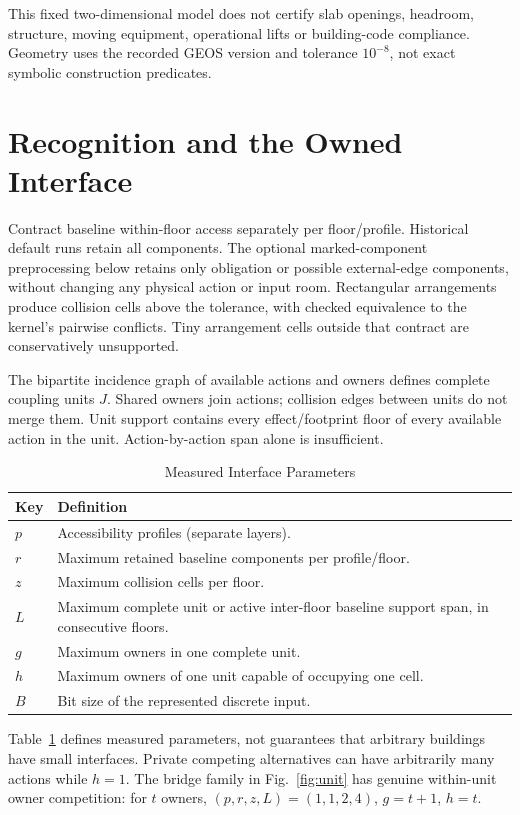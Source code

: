 \documentclass[conference]{IEEEtran}
\begin{document}
This fixed two-dimensional model does not certify slab openings, headroom, structure, moving equipment, operational lifts or building-code compliance. Geometry uses the recorded GEOS version and tolerance $10^{-8}$, not exact symbolic construction predicates.

\section{Recognition and the Owned Interface}
Contract baseline within-floor access separately per floor/profile. Historical default runs retain all components. The optional marked-component preprocessing below retains only obligation or possible external-edge components, without changing any physical action or input room. Rectangular arrangements produce collision cells above the tolerance, with checked equivalence to the kernel's pairwise conflicts. Tiny arrangement cells outside that contract are conservatively unsupported.

The bipartite incidence graph of available actions and owners defines complete coupling units $J$. Shared owners join actions; collision edges between units do not merge them. Unit support contains every effect/footprint floor of every available action in the unit. Action-by-action span alone is insufficient.

\begin{table}[t]
\caption{Measured Interface Parameters}\label{tab:parameters}
\centering\begin{tabular}{p{}p{}}
\toprule Key & Definition \\\midrule
$p$ & Accessibility profiles (separate layers).\\
$r$ & Maximum retained baseline components per profile/floor.\\
$z$ & Maximum collision cells per floor.\\
$L$ & Maximum complete unit or active inter-floor baseline support span, in consecutive floors.\\
$g$ & Maximum owners in one complete unit.\\
$h$ & Maximum owners of one unit capable of occupying one cell.\\
$B$ & Bit size of the represented discrete input.\\
\bottomrule\end{tabular}\end{table}

Table~\ref{tab:parameters} defines measured parameters, not guarantees that arbitrary buildings have small interfaces. Private competing alternatives can have arbitrarily many actions while $h=1$. The bridge family in Fig.~\ref{fig:unit} has genuine within-unit owner competition: for $t$ owners, $(p,r,z,L)=(1,1,2,4)$, $g=t+1$, $h=t$.
\end{document}
